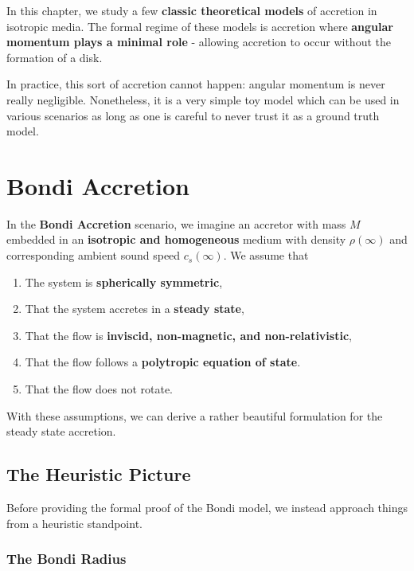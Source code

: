 In this chapter, we study a few \textbf{classic theoretical models} of accretion in isotropic media. The formal regime of these models is accretion where \textbf{angular momentum plays a minimal role} - allowing accretion to occur without the formation of a disk.
\par
In practice, this sort of accretion cannot happen: angular momentum is never really negligible. Nonetheless, it is a very simple toy model which can be used in various scenarios as long as one is careful to never trust it as a ground truth model.

\section{Bondi Accretion}

In the \textbf{Bondi Accretion} scenario, we imagine an accretor with mass $M$ embedded in an \textbf{isotropic and homogeneous} medium with density $\rho(\infty)$ and corresponding ambient sound speed $c_s(\infty)$. We assume that

\begin{enumerate}
    \item The system is \textbf{spherically symmetric},
    \item That the system accretes in a \textbf{steady state},
    \item That the flow is \textbf{inviscid, non-magnetic, and non-relativistic},
    \item That the flow follows a \textbf{polytropic equation of state}.
    \item That the flow does not rotate.
\end{enumerate}

With these assumptions, we can derive a rather beautiful formulation for the steady state accretion.

\subsection{The Heuristic Picture}
Before providing the formal proof of the Bondi model, we instead approach things from a heuristic standpoint.

\subsubsection{The Bondi Radius}

